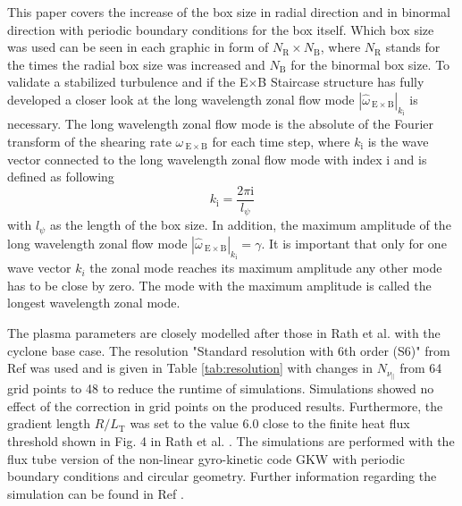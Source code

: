\documentclass[aip, amsmath, amssymb, reprint, twocolumn]{revtex4-1}
\begin{document}
This paper covers the increase of the box size in radial direction and in binormal direction with periodic boundary conditions for the box itself. Which box size was used can be seen in each graphic in form of $N_\mathrm{R}\times N_\mathrm{B}$, where $N_\mathrm{R}$ stands for the times the radial box size was increased and $N_\mathrm{B}$ for the binormal box size. To validate a stabilized turbulence and if the E$\times$B Staircase structure has fully developed a closer look at the long wavelength zonal flow mode $|\widehat{\omega}_{\mathrm{\:E\times B}}|_{k_\mathrm{i}}$ is necessary. The long wavelength zonal flow mode is the absolute of the Fourier transform of the shearing rate $\omega_{\mathrm{\:E \times B}}$ for each time step, where $k_\mathrm{i}$ is the wave vector connected to the long wavelength zonal flow mode with index i and is defined as following
\begin{equation}
	k_\mathrm{i} = \frac{2\pi \mathrm{i}}{l_\psi}
\end{equation}
with $l_\psi$ as the length of the box size. In addition, the maximum amplitude of the long wavelength zonal flow mode  $|\widehat{\omega}_{\mathrm{\:E\times B}}|_{k_\mathrm{i}} = \gamma $. \cite{doi:10.1063/1.4961231} It is important that only for one wave vector $k_i$ the zonal mode reaches its maximum amplitude any other mode has to be close by zero. The mode with the maximum amplitude is called the longest wavelength zonal mode. \bigskip



The plasma parameters are closely modelled after those in Rath et al. \cite{doi:10.1063/1.4961231} with the cyclone base case.
The resolution "Standard resolution with 6th order (S6)" from Ref  was used and is given in Table \ref{tab:resolution} with changes in $N_{\nu_\parallel}$ from 64 grid points to 48 to reduce the runtime of simulations. Simulations showed no effect of the correction in grid points on the produced results. Furthermore, the gradient length $R/L_\mathrm{T}$ was set to the value 6.0 close to the finite heat flux threshold shown in Fig. 4 in Rath et al. \cite{doi:10.1063/1.4961231}. The simulations are performed with the flux tube version of the non-linear gyro-kinetic code GKW \cite{Peeters20092650} with periodic boundary conditions and circular geometry.
Further information regarding the simulation can be found in Ref .
\end{document}
